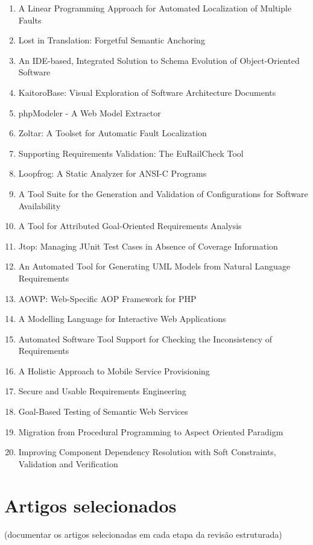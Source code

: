 \begin{enumerate}[itemsep=-1ex]
  \item A Linear Programming Approach for Automated Localization of Multiple Faults
  \item Lost in Translation: Forgetful Semantic Anchoring
  \item An IDE-based, Integrated Solution to Schema Evolution of Object-Oriented Software
  \item KaitoroBase: Visual Exploration of Software Architecture Documents
  \item phpModeler - A Web Model Extractor
  \item Zoltar: A Toolset for Automatic Fault Localization
  \item Supporting Requirements Validation: The EuRailCheck Tool
  \item Loopfrog: A Static Analyzer for ANSI-C Programs
  \item A Tool Suite for the Generation and Validation of Configurations for Software Availability
  \item A Tool for Attributed Goal-Oriented Requirements Analysis
  \item Jtop: Managing JUnit Test Cases in Absence of Coverage Information
  \item An Automated Tool for Generating UML Models from Natural Language Requirements
  \item AOWP: Web-Specific AOP Framework for PHP
  \item A Modelling Language for Interactive Web Applications
  \item Automated Software Tool Support for Checking the Inconsistency of Requirements
  \item A Holistic Approach to Mobile Service Provisioning
  \item Secure and Usable Requirements Engineering
  \item Goal-Based Testing of Semantic Web Services
  \item Migration from Procedural Programming to Aspect Oriented Paradigm
  \item Improving Component Dependency Resolution with Soft Constraints, Validation and Verification
\end{enumerate}

\section{Artigos selecionados}

(documentar os artigos selecionadas em cada etapa da revisão estruturada)

